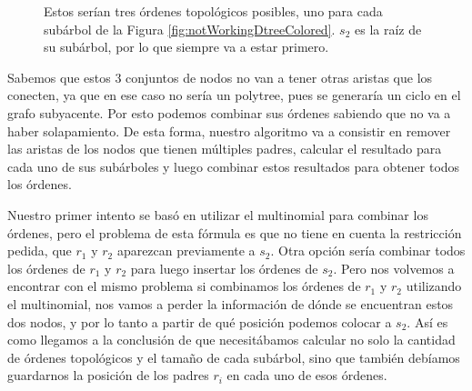  \begin{figure}[ht]
    \centering
    \caption{Estos serían tres órdenes topológicos posibles, uno para cada subárbol de la Figura \ref{fig:notWorkingDtreeColored}. $s_2$ es la raíz de su subárbol, por lo que siempre va a estar primero.}
    \label{fig:multiples_toposorts_polytree}
\end{figure}


Sabemos que estos 3 conjuntos de nodos no van a tener otras aristas que los conecten, ya que en ese caso no sería un polytree, pues se generaría un ciclo en el grafo subyacente. Por esto podemos combinar sus órdenes sabiendo que no va a haber solapamiento. De esta forma, nuestro algoritmo va a consistir en remover las aristas de los nodos que tienen múltiples padres, calcular el resultado para cada uno de sus subárboles y luego combinar estos resultados para obtener todos los órdenes. 

Nuestro primer intento se basó en utilizar el multinomial para combinar los órdenes, pero el problema de esta fórmula es que no tiene en cuenta la restricción pedida, que $r_1$ y $r_2$ aparezcan previamente a $s_2$. Otra opción sería combinar todos los órdenes de $r_1$ y $r_2$ para luego insertar los órdenes de $s_2$. Pero nos volvemos a encontrar con el mismo problema si combinamos los órdenes de $r_1$ y $r_2$ utilizando el multinomial, nos vamos a perder la información de dónde se encuentran estos dos nodos, y por lo tanto a partir de qué posición podemos colocar a $s_2$. Así es como llegamos a la conclusión de que necesitábamos calcular no solo la cantidad de órdenes topológicos y el tamaño de cada subárbol, sino que también debíamos guardarnos la posición de los padres $r_i$ en cada uno de esos órdenes. 

